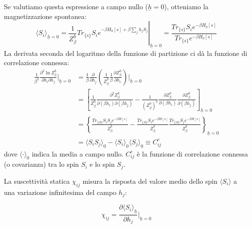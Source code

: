 Se valutiamo questa espressione a campo nullo ($\underline{h}=0$), otteniamo la magnetizzazione spontanea:
\begin{equation}
\langle S_{i}\rangle_{\underline{h}=0} = \left. \frac{1}{Z_{\beta}^{\underline{h}}}Tr_{\{s\}}S_ie^{-\beta H_0[s]+\beta\sum_j h_j S_j} \right|_{\underline{h}=0} = \frac{Tr_{\{s\}}S_ie^{-\beta H_0[s]}}{Tr_{\{s\}}e^{-\beta H_0[s]}}
\end{equation}
La derivata seconda del logaritmo della funzione di partizione ci dà la funzione di correlazione connessa:
\begin{align}
\frac{1}{\beta^2}\frac{\partial^{2}\ln Z_{\beta}^{\underline{h}}}{\partial h_i \partial h_j}\bigg|_{\underline{h}=0} &= \frac{1}{\beta}\frac{\partial}{\partial h_j} \left( \frac{1}{Z_{\beta}^{\underline{h}}} \frac{1}{\beta} \frac{\partial Z_{\beta}^{\underline{h}}}{\partial h_i} \right) \bigg|_{\underline{h}=0} \nonumber \\
&= \left[ \frac{1}{Z_{\beta}^{\underline{h}}}\frac{\partial^{2}Z_{\beta}^{\underline{h}}}{\partial(\beta h_i)\partial(\beta h_j)}-\frac{1}{(Z_{\beta}^{\underline{h}})^{2}}\frac{\partial Z_{\beta}^{\underline{h}}}{\partial(\beta h_i)}\frac{\partial Z_{\beta}^{\underline{h}}}{\partial(\beta h_j)} \right]_{\underline{h}=0} \nonumber \\
&= \left\{ \frac{Tr_{\{S\}}S_i S_j e^{-\beta H[s]}}{Z_{\beta}^{\underline{h}}} - \frac{Tr_{\{S\}}S_i e^{-\beta H[s]}}{Z_{\beta}^{\underline{h}}} \frac{Tr_{\{S\}}S_j e^{-\beta H[s]}}{Z_{\beta}^{\underline{h}}} \right\}_{\underline{h}=0} \nonumber \\
&=\langle S_i S_j \rangle_0 - \langle S_i \rangle_0 \langle S_j \rangle_0 \equiv C_{ij}^{c}
\end{align}
dove $\langle \cdot \rangle_0$ indica la media a campo nullo. $C_{ij}^{c}$ è la funzione di correlazione connessa (o covarianza) tra lo spin $S_i$ e lo spin $S_j$.


\noindent La suscettività statica $\chi_{ij}$ misura la risposta del valore medio dello spin $\langle S_i \rangle$ a una variazione infinitesima del campo $h_j$:

\begin{tcolorbox}[colback=colorA!5, colframe=colorA, arc=3mm, boxrule=1.2pt]
\begin{equation}
\chi_{ij}=\frac{\partial \langle S_i \rangle_{\underline{h}}}{\partial h_j}\bigg|_{\underline{h}=0}
\end{equation}
\end{tcolorbox}

